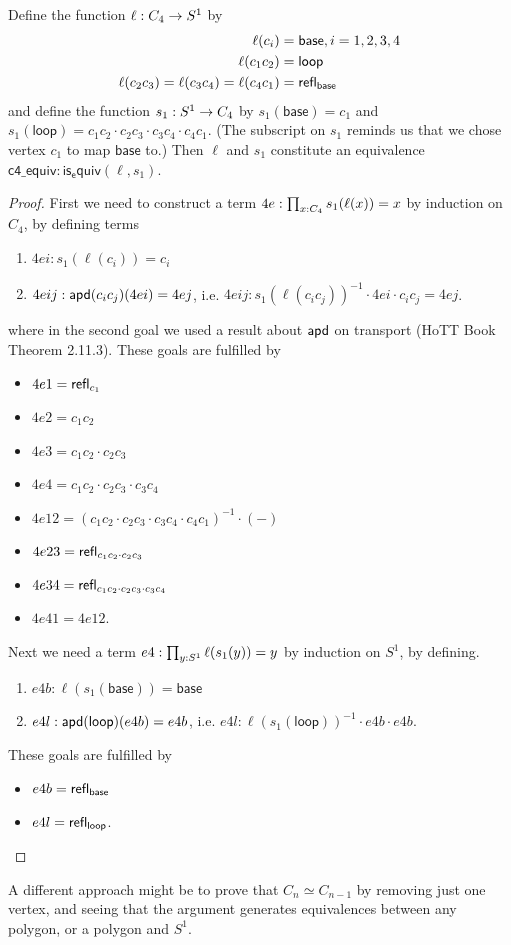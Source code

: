\begin{mylemma}
\label{lem:c4equiv}
Define the function \( \ell:C_4\to S^1 \) by
\begin{align*}
\ell(c_i)&=\mathsf{base}, i=1, 2, 3, 4 \\
\ell(c_1c_2)&=\mathsf{loop} \\
\ell(c_2c_3)=\ell(c_3c_4)=\ell(c_4c_1)&=\mathsf{refl}_{\mathsf{base}}
\end{align*}
and define the function \( s_1:S^1\to C_4 \) by \( s_1(\mathsf{base})=c_1 \) and \( s_1(\mathsf{loop})=c_1c_2\cdot c_2c_3\cdot c_3c_4\cdot c_4c_1 \). (The subscript on \( s_1 \) reminds us that we chose vertex \( c_1 \) to map \( \mathsf{base} \) to.) Then \( \ell \) and \( s_1 \) constitute an equivalence \( \mathsf{c4\_equiv}:\mathsf{is_equiv}(\ell,s_1) \).
\end{mylemma}
\begin{proof}
First we need to construct a term \( 4e:\prod_{x:C_4}s_1(\ell(x))=x \) by induction on \( C_4 \), by defining terms
\begin{enumerate}
\item \( 4ei:s_1(\ell(c_i))=c_i \)
\item \( 4eij:\mathsf{apd}(c_ic_j)(4ei)=4ej \), i.e. \( 4eij: s_1(\ell(c_ic_j))^{-1}\cdot 4ei\cdot c_ic_j=4ej \).
\end{enumerate}
where in the second goal we used a result about \( \mathsf{apd} \) on transport (HoTT Book\cite{hottbook} Theorem 2.11.3). These goals are fulfilled by
\begin{itemize}
\item \( 4e1=\mathsf{refl}_{c_1} \)
\item \( 4e2={c_1c_2} \)
\item \( 4e3={c_1c_2\cdot c_2c_3} \)
\item \( 4e4={c_1c_2\cdot c_2c_3\cdot c_3c_4} \)
\item \( 4e12=(c_1c_2\cdot c_2c_3\cdot c_3c_4\cdot c_4c_1)^{-1}\cdot(-) \)
\item \( 4e23=\mathsf{refl}_{c_1c_2\cdot c_2c_3} \)
\item \( 4e34=\mathsf{refl}_{c_1c_2\cdot c_2c_3\cdot c_3c_4} \)
\item \( 4e41=4e12 \).
\end{itemize}
Next we need a term \( e4:\prod_{y:S^1}\ell(s_1(y))=y \) by induction on \( S^1 \), by defining.
\begin{enumerate}
\item \( e4b:\ell(s_1(\mathsf{base}))=\mathsf{base} \)
\item \( e4l:\mathsf{apd}(\mathsf{loop})(e4b)=e4b \), i.e. \( e4l:\ell(s_1(\mathsf{loop}))^{-1}\cdot e4b\cdot e4b \).
\end{enumerate}
These goals are fulfilled by
\begin{itemize}
\item \( e4b=\mathsf{refl}_{\mathsf{base}} \)
\item \( e4l=\mathsf{refl}_{\mathsf{loop}} \).
\end{itemize}
\end{proof}
A different approach might be to prove that \( C_n\simeq C_{n-1} \) by removing just one vertex, and seeing that the argument generates equivalences between any polygon, or a polygon and \( S^1 \).

